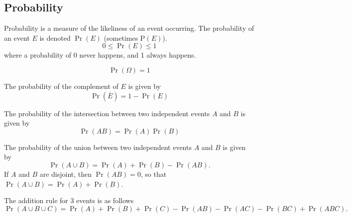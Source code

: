 \documentclass{article}
\begin{document}
\subsection{Probability}
\begin{definition}[Probability]
    Probability is a measure of the likeliness of an event occurring. The probability of
    an event \(E\) is denoted \(\Pr{\left( E \right)}\) (sometimes \(\mathrm{P}\left( E \right)\)).
    \begin{equation*}
        0 \leq \Pr{\left( E \right)} \leq 1
    \end{equation*}
    where a probability of 0 never happens, and 1 always happens.
\end{definition}
\begin{theorem}
    \begin{equation*}
        \Pr{\left( \Omega \right)} = 1
    \end{equation*}
\end{theorem}
\begin{theorem}
    The probability of the complement of \(E\) is given by
    \begin{equation*}
        \Pr{\left( \overline{E} \right)} = 1 - \Pr{\left( E \right)}
    \end{equation*}
\end{theorem}
\begin{theorem}
    The probability of the intersection between two independent events \(A\) and \(B\) is given by
    \begin{equation*}
        \Pr{\left( AB \right)} = \Pr{\left( A \right)} \Pr{\left( B \right)}
    \end{equation*}
\end{theorem}
\begin{theorem}
    The probability of the union between two independent events \(A\) and \(B\) is given by
    \begin{equation*}
        \Pr{\left( A \cup B \right)} = \Pr{\left( A \right)} + \Pr{\left( B \right)} - \Pr{\left( AB \right)}.
    \end{equation*}
    If \(A\) and \(B\) are disjoint, then \(\Pr{\left( AB \right)} = 0\), so that \(\Pr{\left( A \cup B \right)} = \Pr{\left( A \right)} + \Pr{\left( B \right)}\).
\end{theorem}
\begin{corollary}
    The addition rule for 3 events is as follows
    \begin{equation*}
        \Pr{\left( A \cup B \cup C \right)} = \Pr{\left( A \right)} + \Pr{\left( B \right)} + \Pr{\left( C \right)} - \Pr{\left( AB \right)} - \Pr{\left( AC \right)} - \Pr{\left( BC \right)} + \Pr{\left( ABC \right)}.
    \end{equation*}
\end{corollary}
\end{document}
